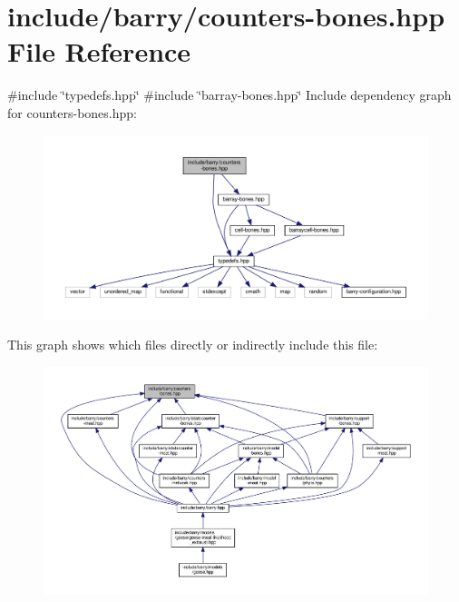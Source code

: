 \hypertarget{counters-bones_8hpp}{}\section{include/barry/counters-\/bones.hpp File Reference}
\label{counters-bones_8hpp}
{\ttfamily \#include \char`\"{}typedefs.\+hpp\char`\"{}}\newline
{\ttfamily \#include \char`\"{}barray-\/bones.\+hpp\char`\"{}}\newline
Include dependency graph for counters-\/bones.hpp\+:\nopagebreak
\begin{figure}[H]
\begin{center}
\leavevmode
\includegraphics[width=350pt]{counters-bones_8hpp__incl}
\end{center}
\end{figure}
This graph shows which files directly or indirectly include this file\+:
\nopagebreak
\begin{figure}[H]
\begin{center}
\leavevmode
\includegraphics[width=350pt]{counters-bones_8hpp__dep__incl}
\end{center}
\end{figure}
